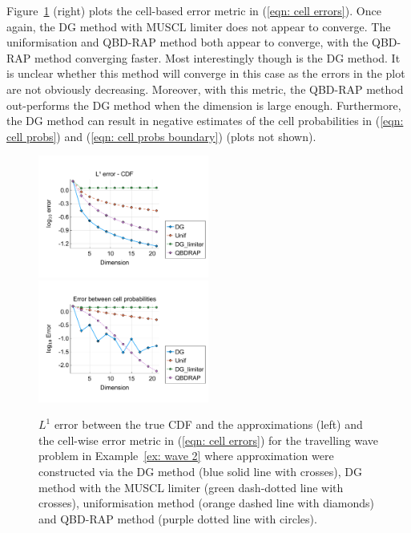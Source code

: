 \begin{example}
Figure~\ref{fig: fun 2 wave} (right) plots the cell-based error metric in (\ref{eqn: cell errors}). Once again, the DG method with MUSCL limiter does not appear to converge. The uniformisation and QBD-RAP method both appear to converge, with the QBD-RAP method converging faster. Most interestingly though is the DG method. It is unclear whether this method will converge in this case as the errors in the plot are not obviously decreasing. Moreover, with this metric, the QBD-RAP method out-performs the DG method when the dimension is large enough. Furthermore, the DG method can result in negative estimates of the cell probabilities in (\ref{eqn: cell probs}) and (\ref{eqn: cell probs boundary}) (plots not shown).
\begin{figure}[h]
	\centering
	\includegraphics[width=0.5\textwidth,trim={0.75cm 0.8cm 0.25cm 1.25cm},clip]{chapter6/figs/wave/fun2/meshs_l1_cdf_error_formatted.pdf}%
	\includegraphics[width=0.5\textwidth,trim={0.75cm 0.8cm 0.25cm 1.25cm},clip]{chapter6/figs/wave/fun2/L1_cell_probs.pdf} 
	\caption{\(L^1\) error between the true CDF and the approximations (left) and the cell-wise error metric in (\ref{eqn: cell errors}) for the travelling wave problem in Example~\ref{ex: wave 2} where approximation were constructed via the DG method (blue solid line with crosses), DG method with the MUSCL limiter (green dash-dotted line with crosses), uniformisation method (orange dashed line with diamonds) and QBD-RAP method (purple dotted line with circles).} 
	\label{fig: fun 2 wave} 
\end{figure}
\exampleFloatBarrier
\end{example}

